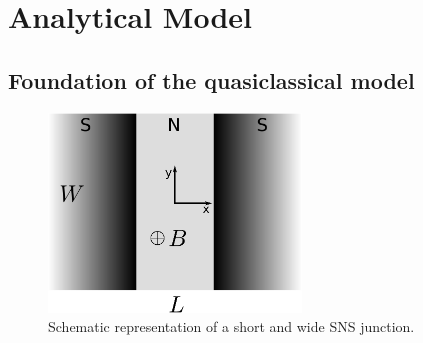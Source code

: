 \chapter{Analytical Model}
\label{ch:analyticalmodel}

\section{Foundation of the quasiclassical model}
\begin{figure}
\centering
\includegraphics[width=0.6\textwidth]{figure/analyticalmodel/sns_junction.pdf}
\caption{Schematic representation of a short and wide SNS junction.}
\label{fig:sns_schematic}
\end{figure}

